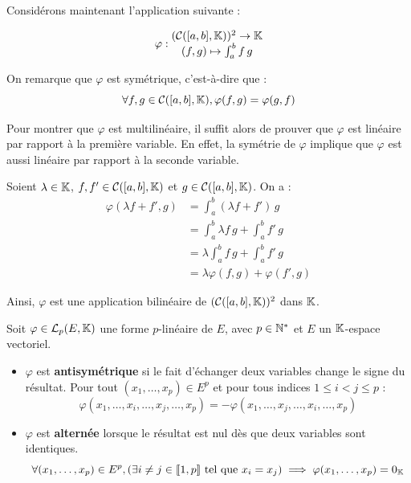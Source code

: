 \documentclass[12pt, a4paper]{report}
\begin{document}
\begin{example}
    Considérons maintenant l'application suivante :

    $$\varphi : \begin{matrix} (\mathcal C([a,b],\mathbb{K}))^2 \to \mathbb{K} \\ (f,g) \mapsto \int_a^b f\, g \end{matrix}$$

    On remarque que $\varphi$ est symétrique, c'est-à-dire que :
    $$\forall f, g \in \mathcal C([a,b],\mathbb{K}), \varphi(f,g) = \varphi(g,f)$$

    Pour montrer que $\varphi$ est multilinéaire, il suffit alors de prouver que $\varphi$ est linéaire par rapport à la première variable. En effet, la symétrie de $\varphi$ implique que $\varphi$ est aussi linéaire par rapport à la seconde variable.

    Soient $\lambda \in \mathbb{K}$, $f, f' \in \mathcal C([a,b],\mathbb{K})$ et $g \in \mathcal C([a,b],\mathbb{K})$. On a :
    \begin{align*}
        \varphi(\lambda f + f', g) &= \int_a^b (\lambda f + f')\, g \\
        &= \int_a^b \lambda f\, g + \int_a^b f'\, g \\
        &= \lambda \int_a^b f\, g + \int_a^b f'\, g \\
        &= \lambda \varphi(f,g) + \varphi(f',g)
    \end{align*}

    Ainsi, $\varphi$ est une application bilinéaire de $(\mathcal C([a,b],\mathbb{K}))^2$ dans $\mathbb{K}$.
\end{example}

\begin{definition}
    Soit $\varphi \in \mathcal L_p(E,\mathbb{K})$ une forme $p$-linéaire de $E$, avec $p \in \mathbb{N}^*$ et $E$ un $\mathbb{K}$-espace vectoriel.
    
    \begin{itemize}
        \item $\varphi$ est \textbf{antisymétrique} si le fait d'échanger deux variables change le signe du résultat. Pour tout $(x_1,\dots,x_p) \in E^p$ et pour tous indices $1 \le i < j \le p$ :
        $$\varphi(x_1, \dots, x_i, \dots, x_j, \dots, x_p) = -\varphi(x_1, \dots, x_j, \dots, x_i, \dots, x_p)$$
        \item $\varphi$ est \textbf{alternée} lorsque le résultat est nul dès que deux variables sont identiques.
        $$\forall (x_1,\dots,x_p) \in E^p, \left(\exists i \ne j \in [\![1,p]\!] \text{ tel que } x_i = x_j\right) \implies \varphi(x_1, \dots, x_p) = 0_{\mathbb{K}}$$
    \end{itemize}
\end{definition}
\end{document}
